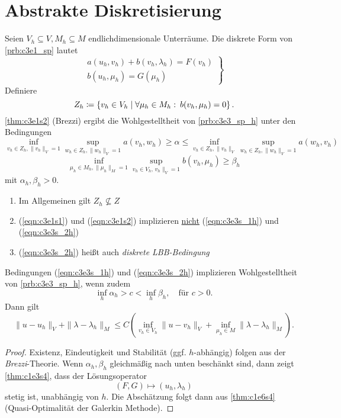\documentclass[../skript.tex]{subfiles}
\begin{document}
\section{Abstrakte Diskretisierung}\label{sec:c3e3}
Seien $V_h\subseteq V, M_h\subseteq M$ endlichdimensionale Unterräume. Die diskrete Form von \cref{prb:c3e1_sp} lautet
\begin{equation*}
	\left.
		\begin{aligned}
			a(u_h,v_h) + b(v_h,\lambda_h) = F(v_h) \\
			b(u_h,\mu_h) = G(\mu_h)
		\end{aligned}
		\right\}\tag{SPh}
		\label{prb:c3e3_sp_h}
\end{equation*}
Definiere
\[
	Z_h \coloneqq \left\{ v_h\in V_h \mathrel{}\middle|\mathrel{} \forall\mu_h\in M_h:\:b(v_h,\mu_h) = 0 \right\}.
\]
\cref{thm:c3e1s2} (Brezzi) ergibt die Wohlgestelltheit von \cref{prb:c3e3_sp_h} unter den Bedingungen
\begin{equation*}
	\inf_{v_h\in Z_h,\|v_h\|_V=1}\sup_{w_h\in Z_h,\|w_h\|_V=1} a(v_h,w_h) \geq\alpha\leq\inf_{v_h\in Z_h,\|v_h\|_V}\sup_{w_h\in Z_h,\|w_h\|_V=1} a(w_h,v_h)\tag{1h}\label{eqn:c3e3s_1h}  %
\end{equation*}
\begin{equation*}
	\inf_{\mu_h\in M_h,\|\mu_h\|_M=1}\sup_{v_h\in V_h,\,v_h\|_V=1} b(v_h,\mu_h) \geq\beta_h\label{eqn:c3e3s_2h}\tag{2h} %
\end{equation*}
mit $\alpha_h,\beta_h > 0$.
\begin{remark}
	\begin{enumerate}
		\item Im Allgemeinen gilt $Z_h\not\subseteq Z$
		\item (\ref{eqn:c3e1s1}) und (\ref{eqn:c3e1s2}) implizieren \underline{nicht} (\ref{eqn:c3e3s_1h}) und (\ref{eqn:c3e3s_2h})
		\item (\ref{eqn:c3e3s_2h}) heißt auch \emph{diskrete LBB-Bedingung}
	\end{enumerate}
\end{remark}

\begin{theorem}\label{thm:c3e3s2}
	Bedingungen (\ref{eqn:c3e3s_1h}) und (\ref{eqn:c3e3s_2h}) implizieren Wohlgestelltheit von \cref{prb:c3e3_sp_h}, wenn zudem 
	\[
		\inf_{h}\alpha_h > c < \inf_h\beta_h,\quad\text{für } c>0.
	\]
	Dann gilt
	\[
		\|u-u_h\|_{V} + \|\lambda-\lambda_h\|_M \leq C\left( \inf_{v_h\in V_h}\|u-v_h\|_V + \inf_{\mu_h\in M}\|\lambda-\lambda_h\|_M \right).
	\]
\end{theorem}
\begin{proof}
	Existenz, Eindeutigkeit und Stabilität (ggf. $h$-abhängig) folgen aus der \emph{Brezzi}-Theorie. Wenn $\alpha_h,\beta_h$ gleichmäßig nach unten beschänkt sind, dann zeigt \cref{thm:c1e3s4}, dass der Lösungsoperator
	\[
		(F,G)\mapsto (u_h,\lambda_h)
	\]
	stetig ist, unabhängig von $h$. Die Abschätzung folgt dann aus \cref{thm:c1e6s4} (Quasi-Optimalität der Galerkin Methode). 
\end{proof}
\end{document}
